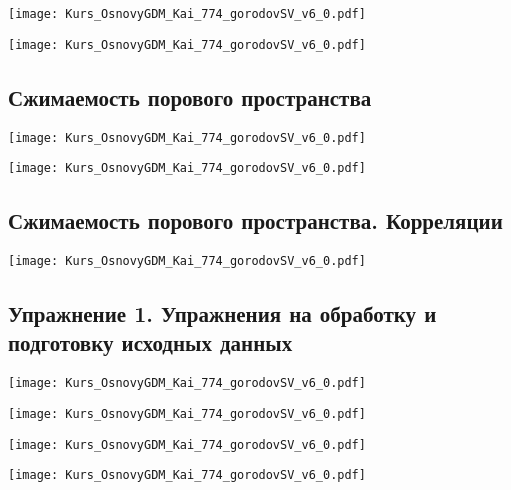 \documentclass[main.tex]{subfiles}
\begin{document}
\texttt{[image: Kurs\_OsnovyGDM\_Kai\_774\_gorodovSV\_v6\_0.pdf]}

\texttt{[image: Kurs\_OsnovyGDM\_Kai\_774\_gorodovSV\_v6\_0.pdf]}

\subsection{Сжимаемость порового пространства}

\texttt{[image: Kurs\_OsnovyGDM\_Kai\_774\_gorodovSV\_v6\_0.pdf]}

\texttt{[image: Kurs\_OsnovyGDM\_Kai\_774\_gorodovSV\_v6\_0.pdf]}

\subsection{Сжимаемость порового пространства. Корреляции}

\texttt{[image: Kurs\_OsnovyGDM\_Kai\_774\_gorodovSV\_v6\_0.pdf]}

\subsection{Упражнение 1. Упражнения на обработку и подготовку исходных данных}

\texttt{[image: Kurs\_OsnovyGDM\_Kai\_774\_gorodovSV\_v6\_0.pdf]}

\texttt{[image: Kurs\_OsnovyGDM\_Kai\_774\_gorodovSV\_v6\_0.pdf]}

\texttt{[image: Kurs\_OsnovyGDM\_Kai\_774\_gorodovSV\_v6\_0.pdf]}

\texttt{[image: Kurs\_OsnovyGDM\_Kai\_774\_gorodovSV\_v6\_0.pdf]}
\end{document}

